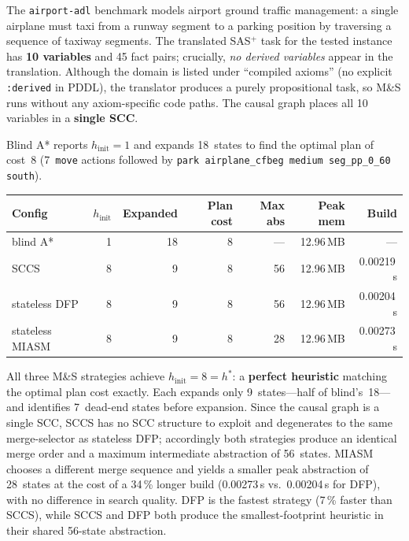 \documentclass[11pt,a4paper]{article}
\begin{document}
The \texttt{airport-adl} benchmark models airport ground traffic management:
a single airplane must taxi from a runway segment to a parking position by
traversing a sequence of taxiway segments.
The translated SAS$^+$ task for the tested instance has \textbf{10 variables}
and 45 fact pairs; crucially, \emph{no derived variables} appear in the
translation.
Although the domain is listed under ``compiled axioms'' (no explicit
\texttt{:derived} in PDDL), the translator produces a purely propositional
task, so M\&S runs without any axiom-specific code paths.
The causal graph places all 10 variables in a \textbf{single SCC}.

Blind A* reports $h_{\mathrm{init}} = 1$ and expands 18~states to find the
optimal plan of cost~8 (7~\texttt{move} actions followed by
\texttt{park airplane\_cfbeg medium seg\_pp\_0\_60 south}).

\begin{center}
\small
\begin{tabular}{lrrrrrr}
\toprule
\textbf{Config} & \textbf{$h_{\mathrm{init}}$} & \textbf{Expanded}
  & \textbf{Plan cost} & \textbf{Max abs} & \textbf{Peak mem} & \textbf{Build} \\
\midrule
blind A*            & 1 & 18 & 8 & ---  & 12.96\,MB & ---       \\
SCCS                & 8 & 9  & 8 & 56   & 12.96\,MB & 0.00219\,s  \\
stateless DFP       & 8 & 9  & 8 & 56   & 12.96\,MB & 0.00204\,s  \\
stateless MIASM     & 8 & 9  & 8 & 28   & 12.96\,MB & 0.00273\,s  \\
\bottomrule
\end{tabular}
\end{center}

All three M\&S strategies achieve $h_{\mathrm{init}} = 8 = h^*$: a
\textbf{perfect heuristic} matching the optimal plan cost exactly.
Each expands only 9~states---half of blind's~18---and identifies 7~dead-end
states before expansion.
Since the causal graph is a single SCC, SCCS has no SCC structure to exploit
and degenerates to the same merge-selector as stateless DFP; accordingly both
strategies produce an identical merge order and a maximum intermediate
abstraction of 56~states.
MIASM chooses a different merge sequence and yields a smaller peak abstraction
of 28~states at the cost of a 34\,\% longer build (0.00273\,s vs.\ 0.00204\,s
for DFP), with no difference in search quality.
DFP is the fastest strategy (7\,\% faster than SCCS), while SCCS and DFP
both produce the smallest-footprint heuristic in their shared 56-state
abstraction.
\end{document}
